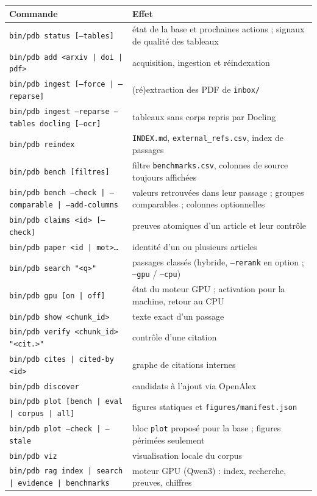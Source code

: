 \documentclass[11pt,a4paper]{article}
\newcommand{\cmd}[1]{\texttt{#1}}
\begin{document}
\begin{center}
\small
\begin{tabularx}{\linewidth}{@{}lL@{}}
\toprule
Commande & Effet \\
\midrule
\cmd{bin/pdb status [--tables]} & état de la base et prochaines actions ; signaux de qualité des tableaux \\
\cmd{bin/pdb add <arxiv | doi | pdf>} & acquisition, ingestion et réindexation \\
\cmd{bin/pdb ingest [--force | --reparse]} & (ré)extraction des PDF de \cmd{inbox/} \\
\cmd{bin/pdb ingest --reparse --tables docling [--ocr]} & tableaux sans corps repris par Docling \\
\cmd{bin/pdb reindex} & \cmd{INDEX.md}, \cmd{external\_refs.csv}, index de passages \\
\cmd{bin/pdb bench [filtres]} & filtre \cmd{benchmarks.csv}, colonnes de source toujours affichées \\
\cmd{bin/pdb bench --check | --comparable | --add-columns} & valeurs retrouvées dans leur passage ; groupes comparables ; colonnes optionnelles \\
\cmd{bin/pdb claims <id> [--check]} & preuves atomiques d'un article et leur contrôle \\
\cmd{bin/pdb paper <id | mot>…} & identité d'un ou plusieurs articles \\
\cmd{bin/pdb search "<q>"} & passages classés (hybride, \cmd{--rerank} en option ; \cmd{--gpu} / \cmd{--cpu}) \\
\cmd{bin/pdb gpu [on | off]} & état du moteur GPU ; activation pour la machine, retour au CPU \\
\cmd{bin/pdb show <chunk\_id>} & texte exact d'un passage \\
\cmd{bin/pdb verify <chunk\_id> "<cit.>"} & contrôle d'une citation \\
\cmd{bin/pdb cites | cited-by <id>} & graphe de citations internes \\
\cmd{bin/pdb discover} & candidats à l'ajout via OpenAlex \\
\cmd{bin/pdb plot [bench | eval | corpus | all]} & figures statiques et \cmd{figures/manifest.json} \\
\cmd{bin/pdb plot --check | --stale} & bloc \cmd{plot} proposé pour la base ; figures périmées seulement \\
\cmd{bin/pdb viz} & visualisation locale du corpus \\
\cmd{bin/pdb rag index | search | evidence | benchmarks} & moteur GPU (Qwen3) : index, recherche, preuves, chiffres \\

\end{tabularx}
\end{center}
\end{document}
